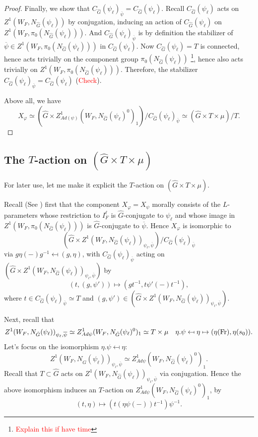 \begin{theorem}
\begin{proof}
    	Finally, we show that $C_{\hat{G}}(\psi_{\ell})_{\overline{\psi}}=C_{\hat{G}}(\psi_{\ell})$. Recall $C_{\hat{G}}(\psi_{\ell})$ acts on $Z^1(W_F, N_{\hat{G}}(\psi_{\ell}))$ by conjugation, inducing an action of $C_{\hat{G}}(\psi_{\ell})$ on $Z^1(W_F, \pi_0(N_{\hat{G}}(\psi_{\ell}))).$ And $C_{\hat{G}}(\psi_{\ell})_{\overline{\psi}}$ is by definition the stabilizer of $\overline{\psi} \in Z^1(W_F, \pi_0(N_{\hat{G}}(\psi_{\ell})))$ in $C_{\hat{G}}(\psi_{\ell})$. Now $C_{\hat{G}}(\psi_{\ell})=T$ is connected, hence acts trivially on the component group $\pi_0(N_{\hat{G}}(\psi_{\ell}))$ \footnote{\textcolor{red}{Explain this if have time}}, hence also acts trivially on $Z^1(W_F, \pi_0(N_{\hat{G}}(\psi_{\ell})))$. Therefore, the stabilizer $C_{\hat{G}}(\psi_{\ell})_{\overline{\psi}}=C_{\hat{G}}(\psi_{\ell})$ (\textcolor{red}{Check}).
    	
    	Above all, we have 
    	$$X_{\varphi} \simeq (\hat{G} \times Z^1_{Ad(\psi)}(W_F, N_{\hat{G}}(\psi_{\ell})^0)_1)/C_{\hat{G}}(\psi_{\ell})_{\overline{\psi}} \simeq (\hat{G} \times T \times \mu)/T.$$
    \end{proof}
\end{theorem}

\subsection{The $T$-action on $(\hat{G} \times T \times \mu)$}

For later use, let me make it explicit the $T$-action on $(\hat{G} \times T \times \mu)$.

Recall (See \cite[Subsection 4.6]{dat2022ihes}) first that the component $X_{\varphi}=X_{\psi}$ morally consists of the $L$-parameters whose restriction to $I_F^{\ell}$ is $\hat{G}$-conjugate to $\psi_{\ell}$ and whose image in $Z^1(W_F, \pi_0(N_{\hat{G}}(\psi_{\ell})))$ is $\hat{G}$-conjugate to $\overline{\psi}$. Hence $X_{\varphi}$ is isomorphic to 
$$(\hat{G} \times Z^1(W_F, N_{\hat{G}}(\psi_{\ell}))_{\psi_{\ell}, \overline{\psi}})/C_{\hat{G}}(\psi_{\ell})_{\overline{\psi}}$$
via $g\eta(-)g^{-1} \mapsfrom (g, \eta)$, with $C_{\hat{G}}(\psi_{\ell})_{\overline{\psi}}$ acting on $(\hat{G} \times Z^1(W_F, N_{\hat{G}}(\psi_{\ell}))_{\psi_{\ell}, \overline{\psi}})$ by 
$$(t, (g, \psi')) \mapsto (gt^{-1}, t\psi'(-)t^{-1}),$$
where $t \in C_{\hat{G}}(\psi_{\ell})_{\overline{\psi}} \simeq T$ and $(g, \psi') \in (\hat{G} \times Z^1(W_F, N_{\hat{G}}(\psi_{\ell}))_{\psi_{\ell}, \overline{\psi}})$.

Next, recall that 
$$Z^1(W_F, N_{\hat{G}}(\psi_{\ell}))_{\psi_{\ell}, \overline{\psi}} \simeq Z^1_{Ad\psi}(W_F, N_{\hat{G}}(\psi_{\ell})^0)_1 \simeq T \times \mu \quad \eta.\psi \mapsfrom \eta \mapsto (\eta(\operatorname{Fr}), \eta(s_0)).$$
Let's focus on the isomorphism $\eta.\psi \mapsfrom \eta$:
$$Z^1(W_F, N_{\hat{G}}(\psi_{\ell}))_{\psi_{\ell}, \overline{\psi}} \simeq Z^1_{Ad\psi}(W_F, N_{\hat{G}}(\psi_{\ell})^0)_1.$$
Recall that $T \subset \hat{G}$ acts on $Z^1(W_F, N_{\hat{G}}(\psi_{\ell}))_{\psi_{\ell}, \overline{\psi}}$ via conjugation. Hence the above isomorphism induces an $T$-action on $Z^1_{Ad\psi}(W_F, N_{\hat{G}}(\psi_{\ell})^0)_1$, by
$$(t, \eta) \mapsto (t(\eta\psi(-)) t^{-1})\psi^{-1}.$$

